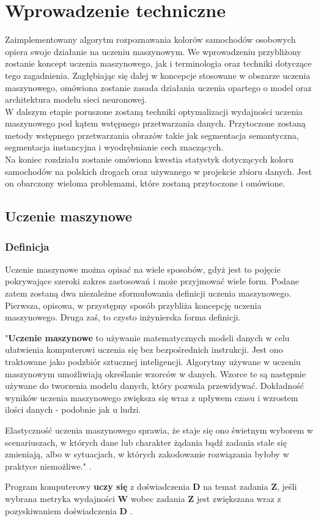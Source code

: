 \section{Wprowadzenie techniczne}

Zaimplementowany algorytm rozpoznawania kolorów samochodów osobowych opiera swoje działanie na uczeniu maszynowym. We wprowadzeniu przybliżony zostanie koncept uczenia maszynowego, jak i terminologia oraz techniki dotyczące tego zagadnienia. Zagłębiając się dalej w koncepcje stosowane w obszarze uczenia maszynowego, omówiona zostanie zasada działania uczenia opartego o model oraz architektura modelu sieci neuronowej.\\
W dalszym etapie poruszone zostaną techniki optymalizacji wydajności uczenia maszynowego pod kątem wstępnego przetwarzania danych. Przytoczone zostaną metody wstępnego przetwarzania obrazów takie jak segmentacja semantyczna, segmentacja instancyjna i wyodrębnianie cech znaczących.\\
Na koniec rozdziału zostanie omówiona kwestia statystyk dotyczących koloru samochodów na polskich drogach oraz używanego w projekcie zbioru danych. Jest on obarczony wieloma problemami, które zostaną przytoczone i omówione.

\subsection{Uczenie maszynowe}
\subsubsection{Definicja}
Uczenie maszynowe można opisać na wiele sposobów, gdyż jest to pojęcie pokrywające szeroki zakres zastosowań i może przyjmować wiele form. Podane zatem zostaną dwa niezależne sformułowania definicji uczenia maszynowego. Pierwsza, opisowa, w przystępny sposób przybliża koncepcję uczenia maszynowego. Druga zaś, to czysto inżynierska forma definicji.

\begin{description}
\item "\textbf{Uczenie maszynowe} to używanie matematycznych modeli danych w celu ułatwienia komputerowi uczenia się bez bezpośrednich instrukcji. Jest ono traktowane jako podzbiór sztucznej inteligencji. Algorytmy używane w uczeniu maszynowym umożliwiają określanie wzorców w danych. Wzorce te są następnie używane do tworzenia modelu danych, który pozwala przewidywać. Dokładność wyników uczenia maszynowego zwiększa się wraz z upływem czasu i wzrostem ilości danych - podobnie jak u ludzi.

Elastyczność uczenia maszynowego sprawia, że staje się ono świetnym wyborem w scenariuszach, w których dane lub charakter żądania bądź zadania stale się zmieniają, albo w sytuacjach, w których zakodowanie rozwiązania byłoby w praktyce niemożliwe." \cite{microsoftazure}.

\item Program komputerowy \textbf{uczy się} z doświadczenia \textbf{D} na temat zadania \textbf{Z}, jeśli wybrana metryka wydajności \textbf{W} wobec zadania \textbf{Z} jest zwiększana wraz z pozyskiwaniem doświadczenia \textbf{D} \cite{tommitchel}.
\end{description}

